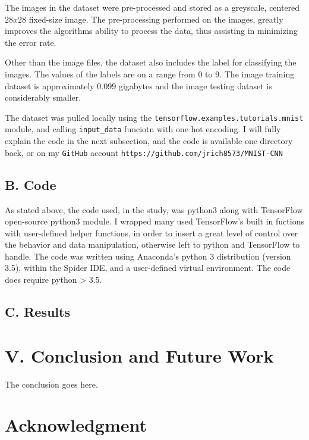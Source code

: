 \documentclass[conference,final,]{IEEEtran}
\begin{document}
The images in the dataset were pre-processed and stored as a greyscale,
centered \(28x28\) fixed-size image. The pre-processing performed on the
images, greatly improves the algorithms ability to process the data,
thus assisting in minimizing the error rate.

Other than the image files, the dataset also includes the label for
classifying the images. The values of the labels are on a range from
\(0\) to \(9\). The image training dataset is approximately \(0.099\)
gigabytes and the image testing dataset is considerably smaller.

The dataset was pulled locally using the
\texttt{tensorflow.examples.tutorials.mnist} module, and calling
\texttt{input\_data} funciotn with one hot encoding. I will fully
explain the code in the next subsection, and the code is available one
directory back, or on my \texttt{GitHub} account
\texttt{https://github.com/jrich8573/MNIST-CNN}

\subsection{B. Code}\label{b.-code}

As stated above, the code used, in the study, was python3 along with
TensorFlow open-source python3 module. I wrapped many used TensorFlow's
built in fuctions with user-defined helper functions, in order to insert
a great level of control over the behavior and data manipulation,
otherwise left to python and TensorFlow to handle. The code was written
using Anaconda's python 3 distribution (version 3.5), within the Spider
IDE, and a user-defined virtual environment. The code does require
python \textgreater{} 3.5.

\subsection{C. Results}\label{c.-results}

\section{V. Conclusion and Future
Work}\label{v.-conclusion-and-future-work}

The conclusion goes here.

\section{Acknowledgment}\label{acknowledgment}
\end{document}
